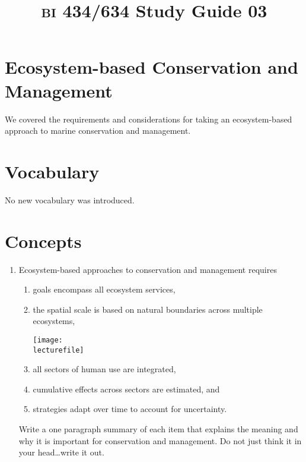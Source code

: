 \documentclass[letterpaper]{tufte-handout}
\title{{\scshape bi} 434/634 Study Guide 03}
\date{} %
\newcommand\lecturefile{434_lecture03_instructor}
\begin{document}
\maketitle	%

\section*{Ecosystem-based Conservation and Management}

We covered the requirements and considerations for taking an ecosystem-based approach to marine conservation and management.

\section*{Vocabulary}

\vspace{-1\baselineskip}
\vspace*{\baselineskip}
No new vocabulary was introduced. \\

\section*{Concepts}

\begin{enumerate}

	\item Ecosystem-based approaches to conservation and management requires
	
	\begin{enumerate}
		\item goals encompass all ecosystem services,
		\item the spatial scale is based on natural boundaries across multiple ecosystems, 

	\begin{marginfigure}
		\texttt{[image: \\lecturefile]}
	\end{marginfigure}
		
		\item all sectors of human use are integrated,
		\item cumulative effects across sectors are estimated, and
		\item strategies adapt over time to account for uncertainty.
	\end{enumerate}

	Write a one paragraph summary of each item that explains the meaning and why it is important for conservation and management. Do not just think it in your head\dots write it out.
		
\end{enumerate}
\end{document}
